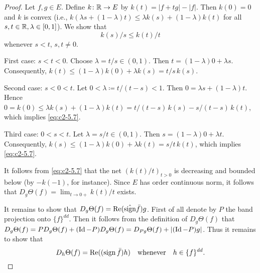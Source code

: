 \begin{proof}
Let $f, g \in E$. Define $k \colon \mathbb{R} \to E$ by $k(t) = |f+tg| - |f|$.
Then $k(0) = 0$ and $k$ is convex (i.e., $k(\lambda s + (1-\lambda)t) \leq \lambda k(s) + (1-\lambda)k(t)$ for all $s, t \in \mathbb{R}, \lambda \in [0,1]$).
We show that
\begin{equation}\label{eq:c2-5.7}
k(s)/s \leq k(t)/t
\end{equation}
whenever $s < t$, $s,t \neq 0$.

First case: $s < t < 0$.
Choose $\lambda = t/s \in (0,1)$. 
Then $t = (1-\lambda)0 + \lambda s$. 
Consequently, $k(t) \leq (1-\lambda)k(0) + \lambda k(s) = t/s \, k(s)$.

Second case: $s < 0 < t$.
Let $0 < \lambda \coloneqq t/(t-s) < 1$. 
Then $0 = \lambda s + (1-\lambda)t$. 
Hence $0 = k(0) \leq \lambda k(s) + (1-\lambda)k(t) = t/(t-s) \, k(s) - s/(t-s) \, k(t)$, which implies \eqref{eq:c2-5.7}.

Third case: $0 < s < t$.
Let $\lambda = s/t \in (0,1)$. Then $s = (1-\lambda)0 + \lambda t$. Consequently, $k(s) \leq (1-\lambda)k(0) + \lambda k(t) = s/t \, k(t)$, which implies \eqref{eq:c2-5.7}.

It follows from \eqref{eq:c2-5.7} that the net $(k(t)/t)_{t>0}$ is decreasing and bounded below (by $-k(-1)$, for instance). Since $E$ has order continuous norm, it follows that $D_{g}\Theta(f) = \lim_{t \to 0+} k(t)/t$ exists.

It remains to show that $D_{g}\Theta(f) = \mathop{}\!\mathrm{Re}(\hat{\operatorname{sign}}  \bar{f})g$.
First of all denote by $P$ the band projection onto $\{f\}^{dd}$. Then it
follows from the definition of $D_{g}\Theta(f)$ that $D_{g}\Theta(f) = PD_{g}\Theta(f) + (\operatorname{Id}-P)D_{g}\Theta(f) = D_{Pg}\Theta(f) + |(\operatorname{Id}-P)g|$. 
Thus it remains to show that
\begin{equation}\label{eq:c2-5.8}
D_{h}\Theta(f) = \mathop{}\!\mathrm{Re}((\operatorname{sign}  \bar{f})h) \quad \text{whenever} \quad h \in \{f\}^{dd}.
\end{equation}


\end{proof}
